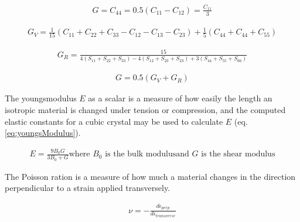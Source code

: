 \begin{equation}
\begin{split}
G = C_{44} = 0.5 (C_{11} - C_{12}) = \frac{C_{11}}{3}
\end{split}
\label{eq:shearModulus}
\end{equation}

\begin{equation}
\begin{split}
G_{V} = \frac{1}{15} \left( C_{11} + C_{22} + C_{33} - C_{12} - C_{13} - C_{23} \right) + \frac{1}{5} \left( C_{44} + C_{44} + C_{55} \right)
\end{split}
\label{eq:shearVoigt}
\end{equation}

\begin{equation}
\begin{split}
G_{R} = \frac{15}{4 \left( S_{11} + S_{22} + S_{33} \right) - 4 \left( S_{12} + S_{23} + S_{23} \right) + 3  \left( S_{44} + S_{55} + S_{66} \right) }
\end{split}
\label{eq:shearReuss}
\end{equation}

\begin{equation}
\begin{split}
G = 0.5(G_V + G_R)
\end{split}
\label{eq:shearReussVoigt}
\end{equation}

The \Gls{youngsmodulus} $E$ as a scalar is a measure of how easily the length an isotropic material is changed under tension or compression, and the computed elastic constants for a cubic crystal may be used to calculate $E$ (eq. \ref{eq:youngsModulus}).

\begin{equation}
\begin{split}
E = \frac{9 B_0 G}{3B_0 + G}
\text{where } B_0 \text{ is the bulk modulus}
\text{and } G \text{ is the shear modulus}
\end{split}
\label{eq:youngsModulus}
\end{equation}


The Poisson ration is a measure of how much a material changes in the direction perpendicular to a strain applied transversely.  

\begin{equation}
\begin{split}
\nu = - \frac{d\epsilon_{perp}}{d\epsilon_{transverse}}
\end{split}
\label{eq:PoissonRatio1}
\end{equation}

